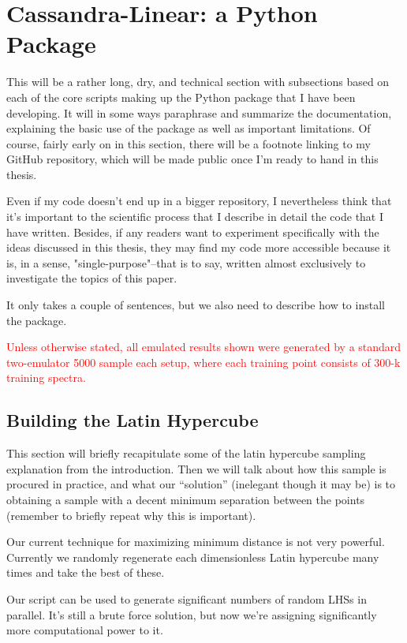 \chapter{Cassandra-Linear: a Python Package}

This will be a rather long, dry, and technical section with subsections based on each of the core scripts making up the Python package that I have been developing. It will in some ways paraphrase and summarize the documentation, explaining the basic use of the package as well as important limitations. Of course, fairly early on in this section, there will be a footnote linking to my GitHub repository, which will be made public once I'm ready to hand in this thesis.

Even if my code doesn't end up in a bigger repository, I nevertheless think that it's important to the scientific process that I describe in detail the code that I have written. Besides, if any readers want to experiment specifically with the ideas discussed in this thesis, they may find my code more accessible because it is, in a sense, "single-purpose"--that is to say, written almost exclusively to investigate the topics of this paper.

It only takes a couple of sentences, but we also need to describe how to install the package.

\textcolor{red}{Unless otherwise stated, all emulated results shown were generated by a standard two-emulator 5000 sample each setup, where each training point consists of 300-k training spectra.}

\section{Building the Latin Hypercube}
\label{sec: build_lhc}


This section will briefly recapitulate some of the latin hypercube sampling
explanation from the introduction. Then we will talk about how this sample is
procured in practice, and what our ``solution'' (inelegant though it may be)
is to obtaining a sample with a decent minimum separation between the points
(remember to briefly repeat why this is important).

Our current technique for maximizing minimum distance is not very powerful.
Currently we randomly regenerate each dimensionless Latin hypercube many
times and take the best of these.

Our script can be used to generate significant numbers of random LHSs in
parallel. It’s still a brute force solution, but now we’re assigning
significantly more computational power to it.

